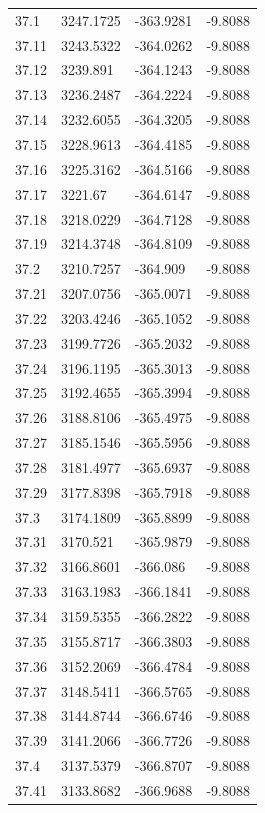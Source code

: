 \begin{table}[H]
\begin{tabular}{llll}
37.1 & 3247.1725 & -363.9281 & -9.8088 \\
37.11 & 3243.5322 & -364.0262 & -9.8088 \\
37.12 & 3239.891 & -364.1243 & -9.8088 \\
37.13 & 3236.2487 & -364.2224 & -9.8088 \\
37.14 & 3232.6055 & -364.3205 & -9.8088 \\
37.15 & 3228.9613 & -364.4185 & -9.8088 \\
37.16 & 3225.3162 & -364.5166 & -9.8088 \\
37.17 & 3221.67 & -364.6147 & -9.8088 \\
37.18 & 3218.0229 & -364.7128 & -9.8088 \\
37.19 & 3214.3748 & -364.8109 & -9.8088 \\
37.2 & 3210.7257 & -364.909 & -9.8088 \\
37.21 & 3207.0756 & -365.0071 & -9.8088 \\
37.22 & 3203.4246 & -365.1052 & -9.8088 \\
37.23 & 3199.7726 & -365.2032 & -9.8088 \\
37.24 & 3196.1195 & -365.3013 & -9.8088 \\
37.25 & 3192.4655 & -365.3994 & -9.8088 \\
37.26 & 3188.8106 & -365.4975 & -9.8088 \\
37.27 & 3185.1546 & -365.5956 & -9.8088 \\
37.28 & 3181.4977 & -365.6937 & -9.8088 \\
37.29 & 3177.8398 & -365.7918 & -9.8088 \\
37.3 & 3174.1809 & -365.8899 & -9.8088 \\
37.31 & 3170.521 & -365.9879 & -9.8088 \\
37.32 & 3166.8601 & -366.086 & -9.8088 \\
37.33 & 3163.1983 & -366.1841 & -9.8088 \\
37.34 & 3159.5355 & -366.2822 & -9.8088 \\
37.35 & 3155.8717 & -366.3803 & -9.8088 \\
37.36 & 3152.2069 & -366.4784 & -9.8088 \\
37.37 & 3148.5411 & -366.5765 & -9.8088 \\
37.38 & 3144.8744 & -366.6746 & -9.8088 \\
37.39 & 3141.2066 & -366.7726 & -9.8088 \\
37.4 & 3137.5379 & -366.8707 & -9.8088 \\
37.41 & 3133.8682 & -366.9688 & -9.8088 \\

\end{tabular}
\end{table}
